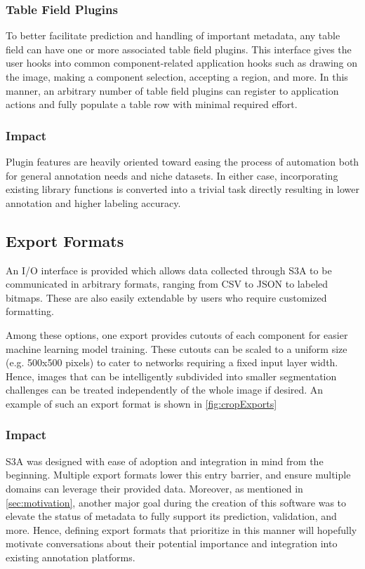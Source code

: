 \makeCustomMiscFuncFig

\subsubsection{Table Field Plugins}

To better facilitate prediction and handling of important metadata, any table field can have one or more associated table field plugins. This interface gives the user hooks into common component-related application hooks such as drawing on the image, making a component selection, accepting a region, and more. In this manner, an arbitrary number of table field plugins can register to application actions and fully populate a table row with minimal required effort.

\subsubsection{Impact}
Plugin features are heavily oriented toward easing the process of automation both for general annotation needs and niche datasets. In either case, incorporating existing library functions is converted into a trivial task directly resulting in lower annotation and higher labeling accuracy.

\subsection{Export Formats}
An I/O interface is provided which allows data collected through S3A to be communicated in arbitrary formats, ranging from CSV to JSON to labeled bitmaps. These are also easily extendable by users who require customized formatting.

Among these options, one export provides cutouts of each component for easier machine learning model training. These cutouts can be scaled to a uniform size (e.g. 500x500 pixels) to cater to networks requiring a fixed input layer width. Hence, images that can be intelligently subdivided into smaller segmentation challenges can be treated independently of the whole image if desired. An example of such an export format is shown in \autoref{fig:cropExports}

\makeCropExportsFig

\subsubsection{Impact}
S3A was designed with ease of adoption and integration in mind from the beginning. Multiple export formats lower this entry barrier, and ensure multiple domains can leverage their provided data. Moreover, as mentioned in \autoref{sec:motivation}, another major goal during the creation of this software was to elevate the status of metadata to fully support its prediction, validation, and more. Hence, defining export formats that prioritize in this manner will hopefully motivate conversations about their potential importance and integration into existing annotation platforms.


